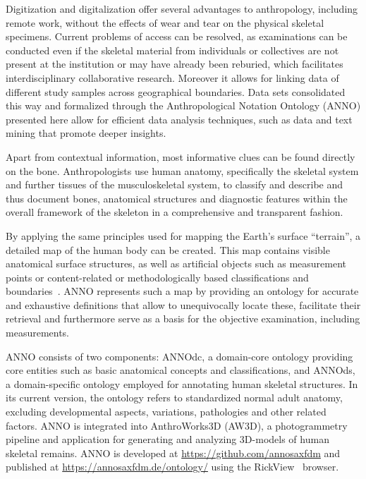 \documentclass[sw]{iosart2x}
\begin{document}
Digitization and digitalization offer several advantages to anthropology, including remote work, without the effects of wear and tear on the physical skeletal specimens.
Current problems of access can be resolved, as examinations can be conducted even if the skeletal material from individuals or collectives are not present at the institution or may have already been reburied, which facilitates interdisciplinary collaborative research.
Moreover it allows for linking data of different study samples across geographical boundaries.
Data sets consolidated this way and formalized through the Anthropological Notation Ontology (ANNO) presented here allow for efficient data analysis techniques, such as data and text mining that promote deeper insights.

Apart from contextual information, most informative clues can be found directly on the bone.
Anthropologists use human anatomy, specifically the skeletal system and further tissues of the musculoskeletal system, to classify and describe and thus document bones, anatomical structures and diagnostic features within the overall framework of the skeleton in a comprehensive and transparent fashion.

By applying the same principles used for mapping the Earth's surface \enquote{terrain}, a detailed map of the human body can be created.
This map contains visible anatomical surface structures, as well as artificial objects such as measurement points or content-related or methodologically based classifications and boundaries~\citep{topo}.
ANNO represents such a map by providing an ontology for accurate and exhaustive definitions that allow to unequivocally locate these, facilitate their retrieval and furthermore serve as a basis for the objective examination, including measurements.

ANNO consists of two components: ANNOdc, a domain-core ontology providing core entities such as basic anatomical concepts and classifications, and ANNOds, a domain-specific ontology employed for annotating human skeletal structures. In its current version, the ontology refers to standardized normal adult anatomy, excluding developmental aspects, variations, pathologies and other related factors.
ANNO is integrated into AnthroWorks3D (AW3D), a photogrammetry pipeline and application for generating and analyzing 3D-models of human skeletal remains.
ANNO is developed at \url{https://github.com/annosaxfdm} and published at \url{https://annosaxfdm.de/ontology/} using the RickView~\citep{rickview} browser.
\end{document}
